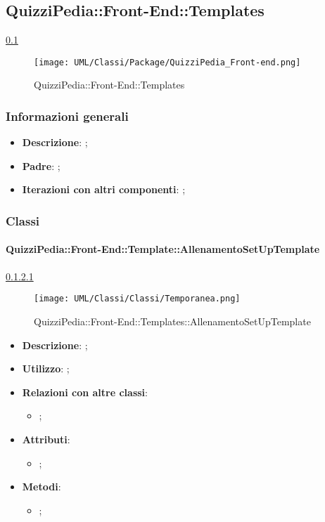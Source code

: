 \newpage

\subsection{QuizziPedia::Front-End::Templates}

	\label{QuizziPedia::Front-End::Templates}
	\ref{QuizziPedia::Front-End::Templates}
	\begin{figure}[h]
		\centering
		\texttt{[image: UML/Classi/Package/QuizziPedia\_Front-end.png]}
		\caption{QuizziPedia::Front-End::Templates}
	\end{figure}
	
	\subsubsection{Informazioni generali}
		\begin{itemize}
			\item \textbf{Descrizione}: ;
			\item \textbf{Padre}: ;
			\item \textbf{Iterazioni con altri componenti}: ;
		\end{itemize}

	\subsubsection{Classi}
		\paragraph{QuizziPedia::Front-End::Template::AllenamentoSetUpTemplate}
		
				\label{QuizziPedia::Front-End::Templates::AllenamentoSetUpTemplate}
				\ref{QuizziPedia::Front-End::Templates::AllenamentoSetUpTemplate}
				\begin{figure}[h]
					\centering
					\texttt{[image: UML/Classi/Classi/Temporanea.png]}
					\caption{QuizziPedia::Front-End::Templates::AllenamentoSetUpTemplate}
				\end{figure}
						
			\begin{itemize}
				\item \textbf{Descrizione}: ;
				\item \textbf{Utilizzo}: ;
				\item \textbf{Relazioni con altre classi}: 
					\begin{itemize}
						\item ;
					\end{itemize}
				\item \textbf{Attributi}: 
					\begin{itemize}
						\item ;
					\end{itemize}
				\item \textbf{Metodi}: 
					\begin{itemize}
						\item ;
					\end{itemize}
			\end{itemize}

